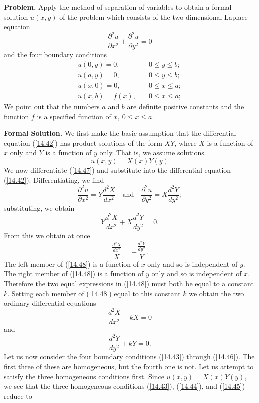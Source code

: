 \documentclass[11pt,a4paper, twoside]{report}
\begin{document}
	\textbf{Problem.} Apply the method of separation of variables to obtain a formal solution $u(x,y)$ of the problem which consists of the two-dimensional Laplace equation
	\begin{equation}\tag{14.42}\label{14.42}
		\frac{\partial^2 u}{\partial x^2} + \frac{\partial^2 u}{\partial y^2} = 0
	\end{equation}
	and the four boundary conditions
	\begin{align}\tag{14.43}\label{14.43}
		u(0, y) = 0,\quad & 0 \leq y \leq b;\\
		\tag{14.44}\label{14.44}
		u(a, y) = 0,\quad & 0 \leq y \leq b;\\
		\tag{14.45}\label{14.45}
		u(x, 0) = 0,\quad & 0 \leq x \leq a;\\
		\tag{14.46}\label{14.46}
		u(x, b) = f(x),\quad & 0 \leq x \leq a;
	\end{align}
	We point out that the numbers $a$ and $b$ are definite positive constants and the function $f$ is a specified function of $x,\ 0 \leq x \leq a$.\par
	\textbf{Formal Solution.} We first make the basic assumption that the differential equation (\ref{14.42}) has product solutions of the form $XY$, where $X$ is a function of $x$ only and $Y$ is a function of $y$ only. That is, we assume solutions
	\begin{equation}\tag{14.47}\label{14.47}
		u(x, y) = X(x)Y(y)
	\end{equation}
	We  now  differentiate  (\ref{14.47})  and  substitute   into  the  differential  equation (\ref{14.42}). Differentiating, we find
	$$
	\frac{\partial^2 u}{\partial x^2} = Y \frac{d^2 X}{dx^2}\quad \text{and} \quad \frac{\partial^2 u}{\partial y^2} = X\frac{d^2Y}{dy^2};
	$$
	substituting, we obtain
	$$
	Y\frac{d^2X}{dx^2} + X\frac{d^2Y}{dy^2} = 0.
	$$
	From this we obtain at once
	\begin{equation}\tag{14.48}\label{14.48}
		\frac{\frac{d^2X}{dx^2}}{X} = -\frac{\frac{d^2Y}{dy^2}}{Y}.
	\end{equation}
	The left member of (\ref{14.48}) is a function of $x$ only and so is independent of $y$. The right member of (\ref{14.48}) is a function of $y$ only and so is independent of  $x$. Therefore the two equal expressions in (\ref{14.48}) must both be equal to a constant $k$. Setting each member of (\ref{14.48}) equal to this constant $k$ we obtain the two ordinary differential equations
	$$
	\frac{d^2X}{dx^2} - kX = 0
	$$
	and
	$$
	\frac{d^2Y}{dy^2} + kY = 0.
	$$
	Let us now consider the four boundary conditions (\ref{14.43}) through (\ref{14.46}). The first three of these are homogeneous, but the fourth one is not. Let us attempt  to satisfy the three homogeneous conditions first. Since $u(x, y) = X(x)Y(y)$, we see that the three homogeneous conditions (\ref{14.43}), (\ref{14.44}), and (\ref{14.45}) reduce  to
\end{document}
